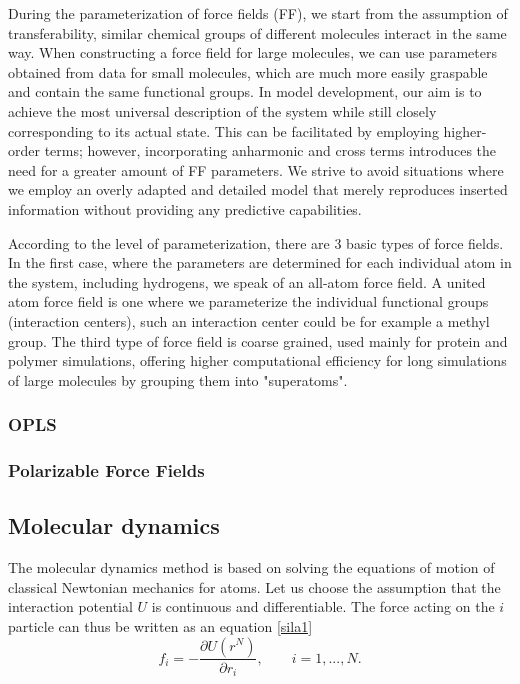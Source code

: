 During the parameterization of force fields (FF), we start from the assumption of transferability,  similar chemical groups of different molecules interact in the same way. When constructing a force field for large molecules, we can use parameters obtained from data for small molecules, which are much more easily graspable and contain the same functional groups. \cite{monticelli_force_2013} In model development, our aim is to achieve the most universal description of the system while still closely corresponding to its actual state. This can be facilitated by employing higher-order terms; however, incorporating anharmonic and cross terms introduces the need for a greater amount of FF parameters. We strive to avoid situations where we employ an overly adapted and detailed model that merely reproduces inserted information without providing any predictive capabilities. \cite{vanommeslaeghe_molecular_2014}

According to the level of parameterization, there are 3 basic types of force fields. In the first case, where the parameters are determined for each individual atom in the system, including hydrogens, we speak of an all-atom force field. A united atom force field is one where we parameterize the individual functional groups (interaction centers), such an interaction center could be for example a methyl group. The third type of force field is coarse grained, used mainly for protein and polymer simulations, offering higher computational efficiency for long simulations of large molecules by grouping them into "superatoms". \cite{da_silva_are_2020}

\subsubsection{OPLS}

\subsubsection{Polarizable Force Fields}

\subsection{Molecular dynamics}
The molecular dynamics method is based on solving the equations of motion of classical Newtonian mechanics for atoms. Let us choose the assumption that the interaction potential $U$ is continuous and differentiable. The force acting on the $i$ particle can thus be written as an equation \ref{sila1} 
\begin{equation}\label{sila1}
	f_i=-\frac{\partial U(r^N)}{\partial r_i}, \qquad i=1,...,N.
\end{equation}

